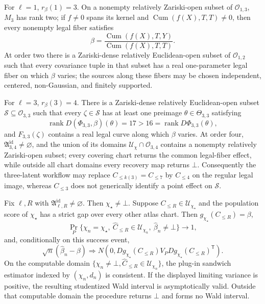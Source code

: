 For \(\ell=1\), \(r_\beta(1)=3\).  On a nonempty relatively Zariski-open subset of \(\mathcal O_{1,3}\), \(M_3\) has rank two; if \(f\ne0\) spans its kernel and \(\operatorname{Cum}(f(X),T,T)\ne0\), then every nonempty legal fiber satisfies
\[
 \beta=\frac{\operatorname{Cum}(f(X),T,Y)}{\operatorname{Cum}(f(X),T,T)}.
\]
At order two there is a Zariski-dense relatively Euclidean-open subset of \(\mathcal O_{1,2}\) such that every covariance tuple in that subset has a real one-parameter legal fiber on which \(\beta\) varies; the sources along these fibers may be chosen independent, centered, non-Gaussian, and finitely supported.

For \(\ell=3\), \(r_\beta(3)=4\).  There is a Zariski-dense relatively Euclidean-open subset \(\mathcal S\subseteq\mathcal O_{3,3}\) such that every \(\zeta\in\mathcal S\) has at least one preimage \(\theta\in\Theta_{3,3}\) satisfying
\[
 \operatorname{rank}D(\Phi_{3,3},\beta)(\theta)=17
 >16=\operatorname{rank}D\Phi_{3,3}(\theta),
\]
and \(F_{3,3}(\zeta)\) contains a real legal curve along which \(\beta\) varies.  At order four, \(\mathfrak A^{\mathrm{id}}_{3,4}\ne\varnothing\), and the union of its domains \(\mathcal U_\chi\cap\mathcal O_{3,4}\) contains a nonempty relatively Zariski-open subset; every covering chart returns the common legal-fiber effect, while outside all chart domains every recovery map returns \(\bot\).  Consequently the three-latent workflow may replace \(C_{\le k(3)}=C_{\le7}\) by \(C_{\le4}\) on the regular legal image, whereas \(C_{\le3}\) does not generically identify a point effect on \(\mathcal S\).

Fix \(\ell,R\) with \(\mathfrak A^{\mathrm{id}}_{\ell,R}\ne\varnothing\).  Then \(\chi_\star\ne\bot\).  Suppose \(C_{\le R}\in\mathcal U_{\chi_\star}\) and the population score of \(\chi_\star\) has a strict gap over every other atlas chart.  Then \(g_{\chi_\star}(C_{\le R})=\beta\),
\[
 \Pr_P\{\chi_n=\chi_\star,\ \widehat C_{\le R}\in\mathcal U_{\chi_n},\ \widehat\beta_n\ne\bot\}\longrightarrow1,
\]
and, conditionally on this success event,
\[
 \sqrt n(\widehat\beta_n-\beta)\Rightarrow
 N\!\left(0,Dg_{\chi_\star}(C_{\le R})V_PDg_{\chi_\star}(C_{\le R})^{\mathsf T}\right).
\]
On the computable domain \(\{\chi_n\ne\bot,\widehat C_{\le R}\in\mathcal U_{\chi_n}\}\), the plug-in sandwich estimator indexed by \((\chi_n,d_n)\) is consistent.  If the displayed limiting variance is positive, the resulting studentized Wald interval is asymptotically valid.  Outside that computable domain the procedure returns \(\bot\) and forms no Wald interval.
